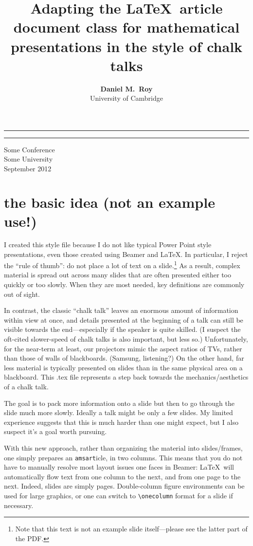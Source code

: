 \documentclass[reqno,oneside,twocolumn,8pt]{amsart}
\title[\LaTeX\ for Chalk Talks] %
{\LARGE Adapting the \LaTeX\ article document class for mathematical 
presentations in the style of chalk talks
}
\author[Daniel Roy]
{{\huge \bf Daniel M.~Roy}\\University of Cambridge}
\theoremstyle{definition}
\theoremstyle{remark}
\begin{document}
\onecolumn
\hrule
\vspace{4em}
\maketitle
\hrule
\vfill
\begin{center}
\sc Some Conference\\Some University\\September 2012
\end{center}

\clearpage

\twocolumn

\section{the basic idea (not an example use!)}

I created this style file because I do not like typical Power Point style presentations, even those created using Beamer and \LaTeX.  In particular, I reject the ``rule of thumb'': do not place a lot of text on a slide.\footnote{Note that this text is not an example slide itself---please see the latter part of the PDF.} As a result, complex material is spread out across many slides that are often presented either too quickly or too slowly.  When they are most needed, key definitions are commonly out of sight.

In contrast, the classic ``chalk talk'' leaves an enormous amount of information within view at once, and details presented at the beginning of a talk can still be visible towards the end---especially if the speaker is quite skilled. (I suspect the oft-cited slower-speed of chalk talks is also important, but less so.)  Unfortunately, for the near-term at least, our projectors mimic the aspect ratios of TVs, rather than those of walls of blackboards.  (Samsung, listening?)  On the other hand, far less material is typically presented on slides than in the same physical area on a blackboard.  This .tex file represents a step back towards the mechanics/aesthetics of a chalk talk.

The goal is to pack more information onto a slide but then to go through the slide much more slowly.  Ideally a talk might be only a few slides.  My limited experience suggests that this is much harder than one might expect, but I also suspect it's a goal worth pursuing.

With this new approach, rather than organizing the material into slides/frames, one simply prepares an {\tt amsart}icle, in two columns.  This means that you do not have to manually resolve most layout issues one faces in Beamer: \LaTeX\ will automatically flow text from one column to the next, and from one page to the next.  Indeed, slides are simply pages. Double-column figure environments can be used for large graphics, or one can switch to {\tt \textbackslash onecolumn} format for a slide if necessary.  
\end{document}
